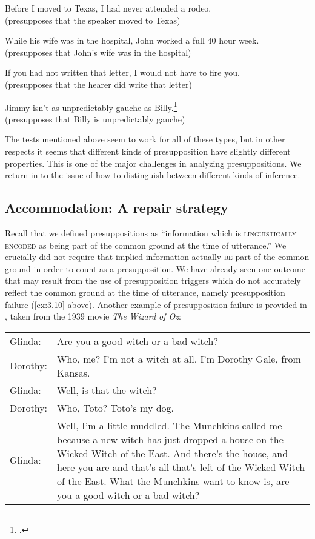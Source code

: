 \ea \label{ex:3.14}
\ea Before I moved to Texas, I had never attended a rodeo.\\
  (presupposes that the speaker moved to Texas)

  \ex While his wife was in the hospital, John worked a full 40 hour week.\\
  (presupposes that John’s wife was in the hospital)

   \ex If you had not written that letter, I would not have to fire you.\\
  (presupposes that the hearer did write that letter) 

  \ex Jimmy isn’t as unpredictably gauche as Billy.\footnote{\citet[183]{Levinson1983}.}\\
  (presupposes that Billy is unpredictably gauche)
                       \z
                       \z


The tests mentioned above seem to work for all of these types, but in other respects it seems that different kinds of presupposition have slightly different properties. This is one of the major challenges in analyzing presuppositions. We return in  to the issue of how to distinguish between different kinds of inference.


\subsection{Accommodation: A repair strategy}\label{sec:3.4.2}\largerpage

Recall that we defined presuppositions as “information which is \textsc{linguistically encoded} as being part of the common ground at the time of utterance.” We crucially did not require that implied information actually \textsc{be} part of the common ground in order to count as a presupposition. We have already seen one outcome that may result from the use of presupposition triggers which do not accurately reflect the common ground at the time of utterance, namely presupposition failure (\ref{ex:3.10} above). Another example of presupposition failure is provided in , taken from the 1939 movie \textit{The Wizard of Oz}:

\ea \label{ex:3.15}\begin{tabular}[t]{@{}lp{9.25cm}@{}} 
Glinda: & Are you a good witch or a bad witch?\\
Dorothy: & Who, me?  I’m not a witch at all.  I’m Dorothy Gale, from Kansas.\\
Glinda: & Well, is that the witch?\\
Dorothy: & Who, Toto?  Toto’s my dog.\\
Glinda: & Well, I’m a little muddled. The Munchkins called me because a new witch has just dropped a house on the Wicked Witch of the East. And there’s the house, and here you are and that’s all that’s left of the Wicked Witch of the East. What the Munchkins want to know is, are you a good witch or a bad witch?
\end{tabular}
\z


